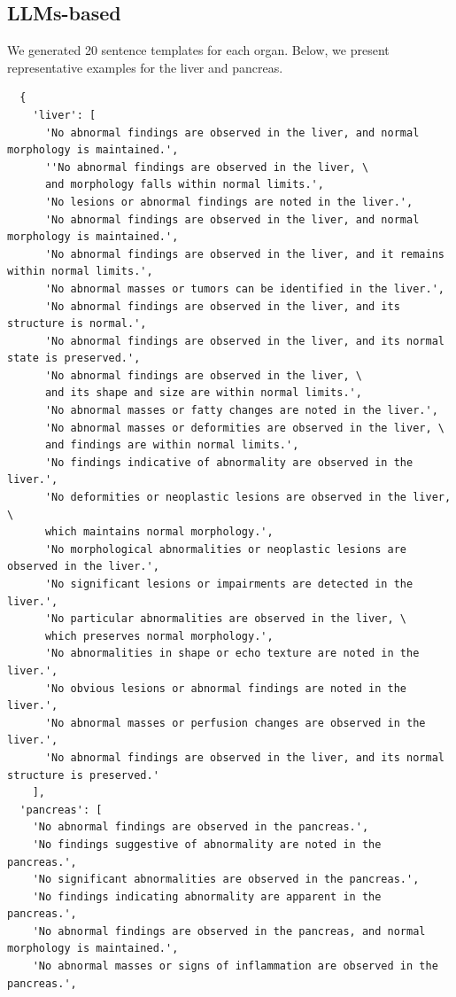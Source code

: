 \documentclass[bioengineering,article,submit,pdftex,moreauthors]{Definitions/mdpi}
\begin{document}
\subsection{LLMs-based}
We generated 20 sentence templates for each organ. Below, we present representative examples for the liver and pancreas.
\begin{verbatim}
  {
    'liver': [
      'No abnormal findings are observed in the liver, and normal morphology is maintained.',
      ''No abnormal findings are observed in the liver, \
      and morphology falls within normal limits.',
      'No lesions or abnormal findings are noted in the liver.',
      'No abnormal findings are observed in the liver, and normal morphology is maintained.',
      'No abnormal findings are observed in the liver, and it remains within normal limits.',
      'No abnormal masses or tumors can be identified in the liver.',
      'No abnormal findings are observed in the liver, and its structure is normal.',
      'No abnormal findings are observed in the liver, and its normal state is preserved.',
      'No abnormal findings are observed in the liver, \
      and its shape and size are within normal limits.',
      'No abnormal masses or fatty changes are noted in the liver.',
      'No abnormal masses or deformities are observed in the liver, \
      and findings are within normal limits.',
      'No findings indicative of abnormality are observed in the liver.',
      'No deformities or neoplastic lesions are observed in the liver, \
      which maintains normal morphology.',
      'No morphological abnormalities or neoplastic lesions are observed in the liver.',
      'No significant lesions or impairments are detected in the liver.',
      'No particular abnormalities are observed in the liver, \
      which preserves normal morphology.',
      'No abnormalities in shape or echo texture are noted in the liver.',
      'No obvious lesions or abnormal findings are noted in the liver.',
      'No abnormal masses or perfusion changes are observed in the liver.',
      'No abnormal findings are observed in the liver, and its normal structure is preserved.'
    ],
  'pancreas': [
    'No abnormal findings are observed in the pancreas.',
    'No findings suggestive of abnormality are noted in the pancreas.',
    'No significant abnormalities are observed in the pancreas.',
    'No findings indicating abnormality are apparent in the pancreas.',
    'No abnormal findings are observed in the pancreas, and normal morphology is maintained.',
    'No abnormal masses or signs of inflammation are observed in the pancreas.',

\end{verbatim}
\end{document}

